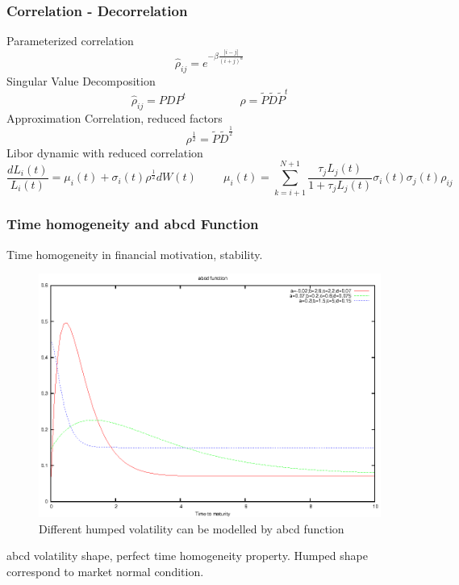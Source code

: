 \documentclass[8pt]{beamer}
\newcommand{\Lit}{L_{i}(t)}
\newcommand{\muit}{\mu_i(t)}
\newcommand{\sigmait}{\sigma_i(t)}
\newcommand{\Ljt}{L_{j}(t)}
\newcommand{\sigmajt}{\sigma_j(t)}
\newcommand{\rhoij}{\rho_{ij}}
\begin{document}
\begin{frame}
\frametitle{Correlation - Decorrelation}
Parameterized correlation
\[
\hat{\rho}_{ij} = e^{- \beta \frac{ |i-j| }{(i+j)^{\alpha}}}
\]
Singular Value Decomposition
\[
\hat{\rho}_{ij} = PDP^t \hspace{2cm} \rho = \tilde{P}\tilde{D}\tilde{P}^t
\]
Approximation Correlation, reduced factors
\[
\rho^{\frac{1}{2}} =  \tilde{P}\tilde{D}^{\frac{1}{2}}
\]
Libor dynamic with reduced correlation
\[
\frac{d\Lit}{\Lit} = \muit + \sigmait \rho^{\frac{1}{2} } dW(t)
\hspace{1cm}
\muit = \sum_{k=i+1}^{N+1} \frac{\tau_j \Ljt}{1+\tau_j \Ljt} \sigmait \sigmajt \rhoij
\]
\end{frame}

\begin{frame}
\frametitle{Time homogeneity and abcd Function}
Time homogeneity in financial motivation, stability.
\begin {figure}[h]
\begin{center}
\includegraphics[scale=0.4]{gnuplot_abcdFunction}
\end{center}
\caption{\label{fig:abcd_curve} Different humped volatility can be modelled by  abcd function}
\end {figure}
abcd volatility shape, perfect time homogeneity property. Humped shape correspond to market normal condition.
\end{frame}
\end{document}
